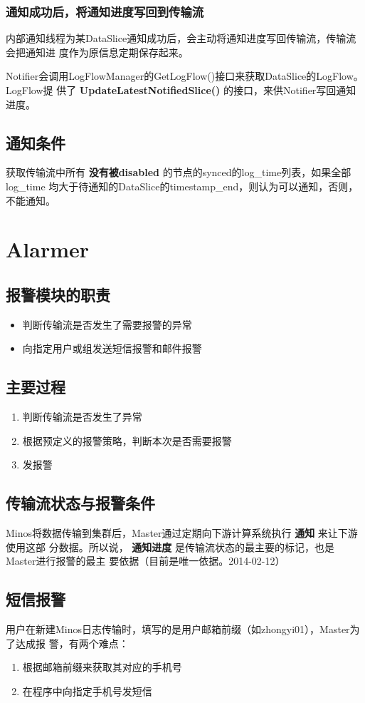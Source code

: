 \documentclass[11pt]{article}
\begin{document}
\subsubsection{通知成功后，将通知进度写回到传输流}
\label{sec-4-2-5}
内部通知线程为某DataSlice通知成功后，会主动将通知进度写回传输流，传输流会把通知进
度作为原信息定期保存起来。

Notifier会调用LogFlowManager的GetLogFlow()接口来获取DataSlice的LogFlow。LogFlow提
供了 \textbf{UpdateLatestNotifiedSlice()} 的接口，来供Notifier写回通知进度。
\subsection{通知条件}
\label{sec-4-3}
获取传输流中所有 \textbf{没有被disabled} 的节点的synced的log\_time列表，如果全部log\_time
均大于待通知的DataSlice的timestamp\_end，则认为可以通知，否则，不能通知。

\section{Alarmer}
\label{sec-5}
\subsection{报警模块的职责}
\label{sec-5-1}
\begin{itemize}
\item 判断传输流是否发生了需要报警的异常
\item 向指定用户或组发送短信报警和邮件报警
\end{itemize}
\subsection{主要过程}
\label{sec-5-2}
\begin{enumerate}
\item 判断传输流是否发生了异常
\item 根据预定义的报警策略，判断本次是否需要报警
\item 发报警
\end{enumerate}
\subsection{传输流状态与报警条件}
\label{sec-5-3}
Minos将数据传输到集群后，Master通过定期向下游计算系统执行 \textbf{通知} 来让下游使用这部
分数据。所以说， \textbf{通知进度} 是传输流状态的最主要的标记，也是Master进行报警的最主
要依据（目前是唯一依据。2014-02-12）
\subsection{短信报警}
\label{sec-5-4}
用户在新建Minos日志传输时，填写的是用户邮箱前缀（如zhongyi01），Master为了达成报
警，有两个难点：
\begin{enumerate}
\item 根据邮箱前缀来获取其对应的手机号
\item 在程序中向指定手机号发短信
\end{enumerate}
\end{document}
